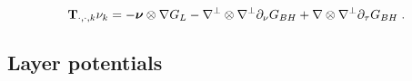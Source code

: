 \documentclass[preprint,12pt]{article}
\def\TT{{\bf T}}
\def\bnu{{\boldsymbol \nu}}
\begin{document}
\begin{equation}
  \TT_{\cdot,\cdot,k} \nu_k = -\bnu \otimes \nabla G_L
  - \nabla^\bot \otimes \nabla^\bot \partial_\nu G_{BH}
  +\nabla \otimes \nabla^\bot \partial_\tau G_{BH} \; .
\end{equation}

\subsection{Layer potentials}




\end{document}
